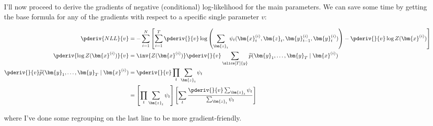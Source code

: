 \documentclass[11pt]{article}
\renewcommand\vec[2][]{\bm{#2}_{#1}}
\begin{document}
I'll now proceed to derive the gradients of negative (conditional) log-likelihood for the main parameters. We can save some time by getting the base formula for any of the gradients with respect to a specific single parameter $v$:
\begin{small}
\begin{align}
	\pderiv{NLL}{v} 
		&=  - \sum_{i=1}^{N} \left[ \sum_{i = 1}^{T} \pderiv{}{v} \log \left( \sum_{\vec[t]{z}} \psi_t(\vec[t]{x}^{(i)}, \vec[t]{z}, \vec[t-1]{y}^{(i)}, \vec[t]{y}^{(i)}) \right) 
		- \pderiv{}{v} \log Z(\vec{x}^{(i)}) \right] \\
	\pderiv{\log Z(\vec{x}^{(i)})}{v}
		&= \inv{Z(\vec{x}^{(i)} )} \pderiv{}{v} \sum_{\slice[T]{y}} \widetilde{p}(\vec[1]{y},\ldots,\vec[T]{y} \mid \vec{x}^{(i)}) \\
	\pderiv{}{v}  \widetilde{p}(\vec[1]{y},\ldots,\vec[T]{y} \mid \vec{x}^{(i)}) 
		&= \pderiv{}{v} \prod_t \sum_{\vec[t]{z}} \psi_t \\
		&= \left[ \prod_t \sum_{\vec[t]{z}} \psi_t \right] \left[
			\sum_t \frac{\pderiv{}{v} \sum_{\vec[t]{z}}  \psi_t }{ \sum_{\vec[t]{z}} \psi_t   }
		 \right]
\end{align}
\end{small}
where I've done some regrouping on the last line to be more gradient-friendly.
\end{document}
